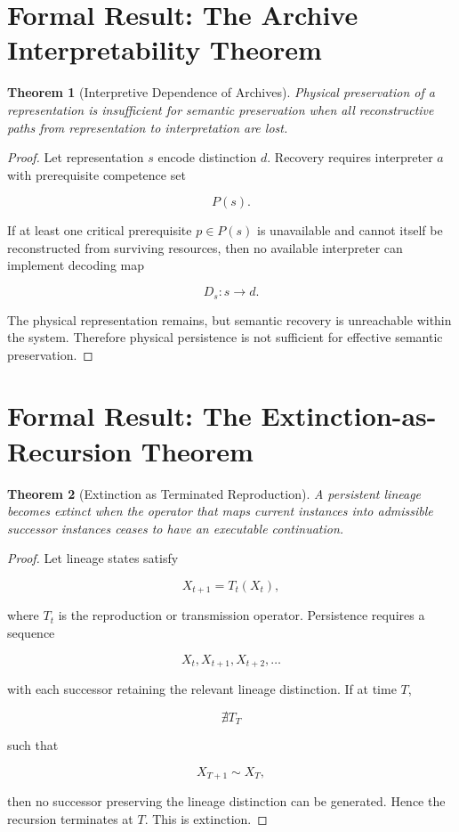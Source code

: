 \documentclass[11pt,oneside]{book}
\newtheorem{theorem}{Theorem}[chapter]
\theoremstyle{definition}
\theoremstyle{remark}
\begin{document}
\section{Formal Result: The Archive Interpretability Theorem}

\begin{theorem}[Interpretive Dependence of Archives] Physical preservation of a representation is
insufficient for semantic preservation when all reconstructive paths from representation to
interpretation are lost. \end{theorem} \begin{proof} Let representation \(s\) encode distinction
\(d\). Recovery requires interpreter \(a\) with prerequisite competence set

\[
P(s).
\]

If at least one critical prerequisite \(p\in P(s)\) is unavailable and cannot itself be
reconstructed from surviving resources, then no available interpreter can implement decoding map

\[
D_s:s\rightarrow d.
\]

The physical representation remains, but semantic recovery is unreachable within the system.
Therefore physical persistence is not sufficient for effective semantic preservation. \end{proof}

\section{Formal Result: The Extinction-as-Recursion Theorem}

\begin{theorem}[Extinction as Terminated Reproduction] A persistent lineage becomes extinct when the
operator that maps current instances into admissible successor instances ceases to have an
executable continuation. \end{theorem} \begin{proof} Let lineage states satisfy

\[
X_{t+1}=T_t(X_t),
\]

where \(T_t\) is the reproduction or transmission operator. Persistence requires a sequence

\[
X_t,X_{t+1},X_{t+2},\ldots
\]

with each successor retaining the relevant lineage distinction. If at time \(T\),

\[
\nexists T_T
\]

such that

\[
X_{T+1}\sim X_T,
\]

then no successor preserving the lineage distinction can be generated. Hence the recursion
terminates at \(T\). This is extinction. \end{proof}
\end{document}
